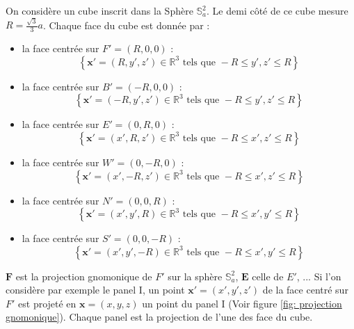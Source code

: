On considère un cube inscrit dans la Sphère $\mathbb{S}_a^2$. Le demi côté de ce cube mesure $R=\frac{\sqrt{3}}{3}a$. Chaque face du cube est donnée par :
\begin{itemize}
\item la face centrée sur $F'=(R,0,0)$ : 
\begin{equation}
\left\lbrace
\mathbf{x}' = (R,y',z') \in \mathbb{R}^3 \text{ tels que } -R  \leq y',z' \leq R
\right\rbrace
\end{equation}

\item la face centrée sur $B'=(-R,0,0)$ : 
\begin{equation}
\left\lbrace
\mathbf{x}' = (-R,y',z') \in \mathbb{R}^3 \text{ tels que } -R  \leq y',z' \leq R
\right\rbrace
\end{equation}

\item la face centrée sur $E'=(0,R,0)$ : 
\begin{equation}
\left\lbrace
\mathbf{x}' = (x',R,z') \in \mathbb{R}^3 \text{ tels que } -R  \leq x',z' \leq R
\right\rbrace
\end{equation}

\item la face centrée sur $W'=(0,-R,0)$ : 
\begin{equation}
\left\lbrace
\mathbf{x}' = (x',-R,z') \in \mathbb{R}^3 \text{ tels que } -R  \leq x',z' \leq R
\right\rbrace
\end{equation}

\item la face centrée sur $N'=(0,0,R)$ : 
\begin{equation}
\left\lbrace
\mathbf{x}' = (x',y',R) \in \mathbb{R}^3 \text{ tels que } -R  \leq x',y' \leq R
\right\rbrace
\end{equation}

\item la face centrée sur $S'=(0,0,-R)$ : 
\begin{equation}
\left\lbrace
\mathbf{x}' = (x',y',-R) \in \mathbb{R}^3 \text{ tels que } -R  \leq x',y' \leq R
\right\rbrace
\end{equation}
\end{itemize}

$\mathbf{F}$ est la projection gnomonique de $F'$ sur la sphère $\mathbb{S}_a^2$, $\mathbf{E}$ celle de $E'$, ...
Si l'on considère par exemple le panel I, un point $\mathbf{x}'=(x',y',z')$ de la face centré sur $F'$ est projeté en $\mathbf{x} = (x,y,z)$ un point du panel I (Voir figure \ref{fig: projection gnomonique}). Chaque panel est la projection de l'une des face du cube.

